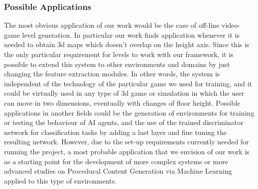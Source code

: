 \subsubsection{Possible Applications}
The most obvious application of our work would be the case of off-line video-game level generation. In particular our work finds application whenever it is needed to obtain 3d maps which doesn't overlap on the height axis. Since this is the only particular requirement for levels to work with our framework, it is possible to extend this system to other environments and domains by just changing the feature extraction modules. In other words, the system is independent of the technology of the particular game we used for training, and it could be virtually used in any type of 3d game or simulation in which the user can move in two dimensions, eventually with changes of floor height. Possible applications in another fields could be the generation of environments for training or testing the behaviour of AI agents, and the use of the trained discriminator network for classification tasks by adding a last layer and fine tuning the resulting network. However, due to the set-up requirements currently needed for running the project, a most probable application that we envision of our work is as a starting point for the development of more complex systems or more advanced studies on Procedural Content Generation via Machine Learning applied to this type of environments.

